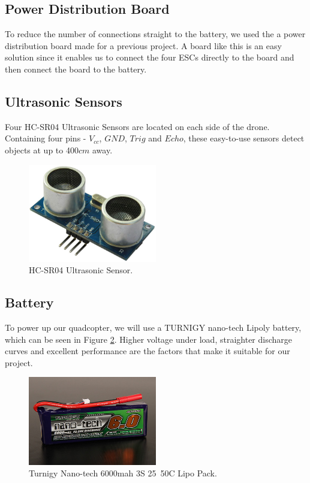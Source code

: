 \subsection{Power Distribution Board}
To reduce the number of connections straight to the battery, we used the a power distribution board made for a previous project. A board like this is an easy solution since it enables us to connect the four ESCs directly to the board and then connect the board to the battery.

\subsection{Ultrasonic Sensors}
Four HC-SR04 Ultrasonic Sensors are located on each side of the drone. Containing four pins - $V_{cc}$, $GND$, $Trig$ and $Echo$, these easy-to-use sensors detect objects at up to 400$cm$ away.
\begin{figure}[H]
  \centering
    \includegraphics[width=0.5\textwidth]{images/HCSR04.jpg}
	\caption{HC-SR04 Ultrasonic Sensor.}
	\label{HC}
\end{figure}

\subsection{Battery}
To power up our quadcopter, we will use a TURNIGY nano-tech Lipoly battery, which can be seen in Figure \ref{battery}. Higher voltage under load, straighter discharge curves and excellent performance are the factors that make it suitable for our project. 

\begin{figure}[H]
  \centering
    \includegraphics[width=0.5\textwidth]{images/battery.jpg}
	\caption{Turnigy Nano-tech 6000mah 3S 25~50C Lipo Pack.}
	\label{battery}
\end{figure}

